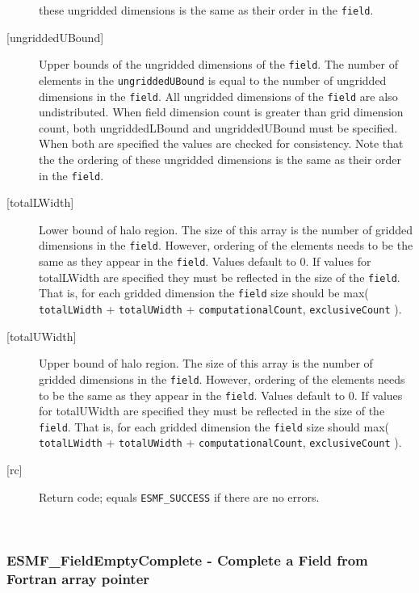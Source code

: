 \begin{description}
   these ungridded dimensions is the same as their order in the {\tt field}. 
   \item [{[ungriddedUBound]}] 
   Upper bounds of the ungridded dimensions of the {\tt field}. 
   The number of elements in the {\tt ungriddedUBound} is equal to the number of ungridded 
   dimensions in the {\tt field}. All ungridded dimensions of the 
   {\tt field} are also undistributed. When field dimension count is 
   greater than grid dimension count, both ungriddedLBound and ungriddedUBound 
   must be specified. When both are specified the values are checked 
   for consistency. Note that the the ordering of 
   these ungridded dimensions is the same as their order in the {\tt field}. 
   \item [{[totalLWidth]}] 
   Lower bound of halo region. The size of this array is the number 
   of gridded dimensions in the {\tt field}. However, ordering of the elements 
   needs to be the same as they appear in the {\tt field}. Values default 
   to 0. If values for totalLWidth are specified they must be reflected in 
   the size of the {\tt field}. That is, for each gridded dimension the 
   {\tt field} size should be max( {\tt totalLWidth} + {\tt totalUWidth} 
   + {\tt computationalCount}, {\tt exclusiveCount} ). 
   \item [{[totalUWidth]}] 
   Upper bound of halo region. The size of this array is the number 
   of gridded dimensions in the {\tt field}. However, ordering of the elements 
   needs to be the same as they appear in the {\tt field}. Values default 
   to 0. If values for totalUWidth are specified they must be reflected in 
   the size of the {\tt field}. That is, for each gridded dimension the 
   {\tt field} size should max( {\tt totalLWidth} + {\tt totalUWidth} 
   + {\tt computationalCount}, {\tt exclusiveCount} ). 
   \item [{[rc]}] 
   Return code; equals {\tt ESMF\_SUCCESS} if there are no errors. 
   \end{description} 
    
 
\mbox{}\hrulefill\ 
 
\subsubsection [ESMF\_FieldEmptyComplete] {ESMF\_FieldEmptyComplete - Complete a Field from Fortran array pointer }


